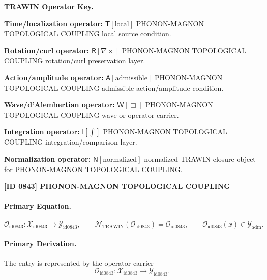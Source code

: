 \par\vspace{0.45\baselineskip}
\noindent\begin{minipage}[t]{\linewidth}
\begingroup
\small
\raggedright
\textbf{TRAWIN Operator Key.}\par
\noindent\textbf{Time/localization operator:} $\mathsf{T}\!\left[\mathrm{local}\right]$ PHONON-MAGNON TOPOLOGICAL COUPLING local source condition.\par
\noindent\textbf{Rotation/curl operator:} $\mathsf{R}\!\left[\nabla\times\right]$ PHONON-MAGNON TOPOLOGICAL COUPLING rotation/curl preservation layer.\par
\noindent\textbf{Action/amplitude operator:} $\mathsf{A}\!\left[\mathrm{admissible}\right]$ PHONON-MAGNON TOPOLOGICAL COUPLING admissible action/amplitude condition.\par
\noindent\textbf{Wave/d'Alembertian operator:} $\mathsf{W}\!\left[\Box\right]$ PHONON-MAGNON TOPOLOGICAL COUPLING wave or operator carrier.\par
\noindent\textbf{Integration operator:} $\mathsf{I}\!\left[\int\right]$ PHONON-MAGNON TOPOLOGICAL COUPLING integration/comparison layer.\par
\noindent\textbf{Normalization operator:} $\mathsf{N}\!\left[\mathrm{normalized}\right]$ normalized TRAWIN closure object for PHONON-MAGNON TOPOLOGICAL COUPLING.\par
\endgroup
\end{minipage}

\clearpage
\noindent\textbf{[ID 0843] PHONON-MAGNON TOPOLOGICAL COUPLING}\par
\vspace{0.35em}
\paragraph{Primary Equation.}
\[
\mathcal{O}_{\mathrm{id0843}}:\mathcal{X}_{\mathrm{id0843}}\longrightarrow \mathcal{Y}_{\mathrm{id0843}},\qquad
\mathcal{N}_{\mathrm{TRAWIN}}(\mathcal{O}_{\mathrm{id0843}})=\mathcal{O}_{\mathrm{id0843}},\qquad
\mathcal{O}_{\mathrm{id0843}}(x)\in\mathcal{Y}_{\mathrm{adm}}.
\]

\paragraph{Primary Derivation.} The entry is represented by the operator carrier\[
\mathcal{O}_{\mathrm{id0843}}:\mathcal{X}_{\mathrm{id0843}}\longrightarrow \mathcal{Y}_{\mathrm{id0843}}.
\]

